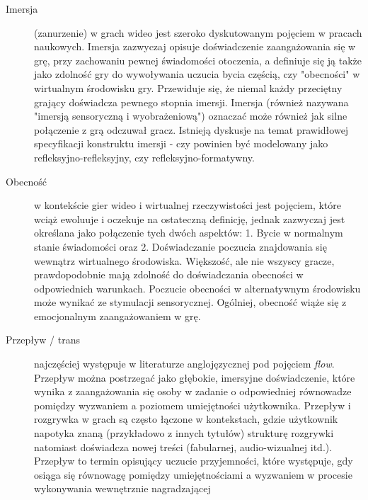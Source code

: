 \begin{description}
      \item[Imersja] (zanurzenie) w grach wideo jest szeroko dyskutowanym pojęciem w pracach
            naukowych. Imersja zazwyczaj opisuje doświadczenie zaangażowania się w grę, przy zachowaniu pewnej
            świadomości otoczenia, a definiuje się ją także jako zdolność gry do wywoływania uczucia bycia
            częścią, czy "obecności" w wirtualnym środowisku gry. Przewiduje się, że niemal każdy przeciętny grający
            doświadcza pewnego stopnia imersji\cite{development_of_game}. Imersja (również nazywana "imersją
            sensoryczną i wyobrażeniową") oznaczać może również jak silne połączenie z grą odczuwał gracz\cite{validation_of_ge_scales}.
            Istnieją dyskusje na temat prawidłowej specyfikacji konstruktu imersji - czy powinien być modelowany
            jako refleksyjno-refleksyjny, czy refleksyjno-formatywny\cite{eng_in_games}.
      \item[Obecność] w kontekście gier wideo i wirtualnej rzeczywistości jest pojęciem, które
            wciąż ewoluuje i oczekuje na ostateczną definicję, jednak zazwyczaj jest określana jako połączenie
            tych dwóch aspektów: 1. Bycie w normalnym stanie świadomości oraz 2. Doświadczanie poczucia znajdowania się
            wewnątrz wirtualnego środowiska\cite{development_of_game}. Większość, ale nie wszyscy gracze, prawdopodobnie mają zdolność do
            doświadczania obecności w odpowiednich warunkach\cite{development_of_game}. Poczucie obecności w
            alternatywnym środowisku może wynikać ze stymulacji sensorycznej\cite{measuring_narrative}.
            Ogólniej, obecność wiąże się z emocjonalnym zaangażowaniem w grę\cite{validation_of_ge_scales}.
      \item[Przepływ / trans] najczęściej występuje w literaturze anglojęzycznej pod pojęciem \textit{flow}.
            Przepływ można postrzegać jako głębokie, imersyjne doświadczenie, które wynika z zaangażowania się
            osoby w zadanie o odpowiedniej równowadze pomiędzy wyzwaniem a poziomem umiejętności użytkownika\cite{measuring_engagement}.
            Przepływ i rozgrywka w grach są często łączone w kontekstach, gdzie użytkownik napotyka znaną (przykładowo
            z innych tytułów) strukturę rozgrywki natomiast doświadcza nowej treści (fabularnej,
            audio-wizualnej itd.)\cite{measuring_engagement}. Przepływ to termin opisujący uczucie przyjemności, które występuje, gdy osiąga
            się równowagę pomiędzy umiejętnościami a wyzwaniem w procesie wykonywania wewnętrznie nagradzającej

\end{description}

